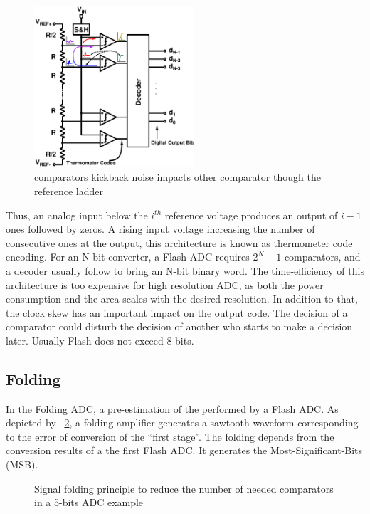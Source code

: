 \begin{figure}[htp]
	\centering
	\includegraphics[height=6cm]{Chapter3/Figs/flash_adc.ps}
	\caption{comparators kickback noise impacts other comparator though the reference ladder}
	\label{fig:flash_kickback}
\end{figure}

Thus, an analog input below the \(i^{th} \) reference voltage produces an output of \(i-1 \) ones followed by zeros. A rising input voltage increasing the number of consecutive ones at the output, this architecture is known as thermometer code encoding. For an N-bit converter, a Flash ADC requires \(2^N-1\) comparators, and a decoder usually follow to bring an N-bit binary word. The time-efficiency of this architecture is too expensive for high resolution ADC, as both the power consumption and the area scales with the desired resolution. In addition to that, the clock skew has an important impact on the output code. The decision of a comparator could disturb the decision of another who starts to make a decision later. Usually Flash does not exceed 8-bits.

\subsection{Folding}                           %
\label{sec:folding-adc}
In the Folding ADC, a pre-estimation of the performed by a Flash ADC. As depicted by \figurename~\ref{fig:folding_principle}, a folding amplifier generates a sawtooth waveform corresponding to the error of conversion of the ``first stage''. The folding depends from the conversion results of a the first Flash ADC. It generates the Most-Significant-Bits (MSB).

\begin{figure}[htp]
	\centering
	\resizebox{0.8\textwidth}{!} {}
	\caption{Signal folding principle to reduce the number of needed comparators in a 5-bits ADC example}
	\label{fig:folding_principle}
\end{figure}

